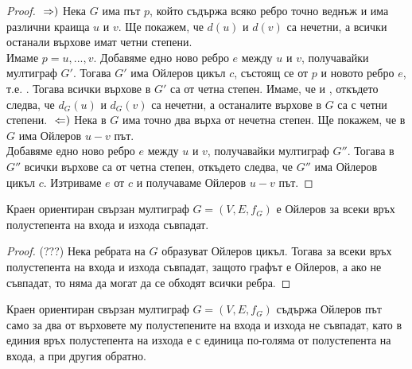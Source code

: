 \begin{proof}
    \(\newline\Rightarrow)\) Нека \(G\) има път \(p\), който съдържа всяко ребро точно веднъж и има 
    различни краища \(u\) и \(v\). Ще покажем, че \(d(u)\) и \(d(v)\) са нечетни, а всички останали върхове 
    имат четни степени. \\
    Имаме \(p = u, ..., v\). Добавяме едно ново ребро \(e\) между \(u\) и \(v\), получавайки мултиграф 
    \(G'\). Тогава \(G'\) има Ойлеров цикъл \(c\), състоящ се от \(p\) и новото ребро \(e\), т.е. 
    . Тогава всички върхове в \(G'\) са от четна степен. Имаме, че 
     и , откъдето следва, че \(d_G(u)\) и \(d_G(v)\) са нечетни, а 
    останалите върхове в \(G\) са с четни степени.
    \(\newline\Leftarrow)\) Нека в \(G\) има точно два върха от нечетна степен. Ще покажем, че в \(G\) 
    има Ойлеров \(u-v\) път. \\
    Добавяме едно ново ребро \(e\) между \(u\) и \(v\), получавайки мултиграф \(G''\). Тогава в \(G''\) 
    всички върхове са от четна степен, откъдето следва, че \(G''\) има Ойлеров цикъл \(c\). Изтриваме 
    \(e\) от \(c\) и получаваме Ойлеров \(u-v\) път.
\end{proof}

\begin{theorem}
    Краен ориентиран свързан мултиграф \(G = (V, E, f_G)\) е Ойлеров \totw за всеки връх полустепента на 
    входа и изхода съвпадат.
\end{theorem}

\begin{proof}
    (???) Нека ребрата на \(G\) образуват Ойлеров цикъл. Тогава за всеки връх полустепента на входа и изхода 
    съвпадат, защото графът е Ойлеров, а ако не съвпадат, то няма да могат да се обходят всички ребра.
\end{proof}

\begin{theorem}
    Краен ориентиран свързан мултиграф \(G = (V, E, f_G)\) съдържа Ойлеров път \totw само за два от 
    върховете му полустепените на входа и изхода не съвпадат, като в единия връх полустепента на изхода е 
    с единица по-голяма от полустепента на входа, а при другия обратно.
\end{theorem}

